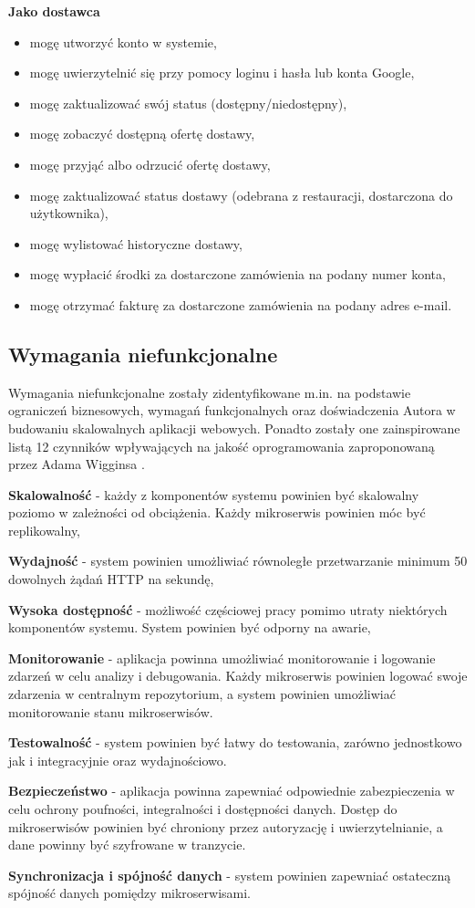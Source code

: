 \medskip

\textbf{Jako dostawca}
\begin{itemize}
    \item mogę utworzyć konto w systemie,
    \item mogę uwierzytelnić się przy pomocy loginu i hasła lub konta Google,
    \item mogę zaktualizować swój status (dostępny/niedostępny),
    \item mogę zobaczyć dostępną ofertę dostawy,
    \item mogę przyjąć albo odrzucić ofertę dostawy,
    \item mogę zaktualizować status dostawy (odebrana z restauracji, dostarczona do użytkownika),
    \item mogę wylistować historyczne dostawy,
    \item mogę wypłacić środki za dostarczone zamówienia na podany numer konta,
    \item mogę otrzymać fakturę za dostarczone zamówienia na podany adres e-mail.
\end{itemize}

\subsection{Wymagania niefunkcjonalne}

Wymagania niefunkcjonalne zostały zidentyfikowane m.in. na podstawie ograniczeń biznesowych, wymagań funkcjonalnych oraz doświadczenia Autora w budowaniu skalowalnych aplikacji webowych. Ponadto zostały one zainspirowane listą 12 czynników wpływających na jakość oprogramowania zaproponowaną przez Adama Wigginsa \cite{12factors}.

\textbf{Skalowalność} - każdy z komponentów systemu powinien być skalowalny poziomo w zależności od obciążenia. Każdy mikroserwis powinien móc być replikowalny,

\textbf{Wydajność} - system powinien umożliwiać równoległe przetwarzanie minimum 50 dowolnych żądań HTTP na sekundę,

\textbf{Wysoka dostępność} - możliwość częściowej pracy pomimo utraty niektórych komponentów systemu. System powinien być odporny na awarie,

\textbf{Monitorowanie} - aplikacja powinna umożliwiać monitorowanie i logowanie zdarzeń w celu analizy i debugowania. Każdy mikroserwis powinien logować swoje zdarzenia w centralnym repozytorium, a system powinien umożliwiać monitorowanie stanu mikroserwisów.

\textbf{Testowalność} - system powinien być łatwy do testowania, zarówno jednostkowo jak i integracyjnie oraz wydajnościowo.

\textbf{Bezpieczeństwo} - aplikacja powinna zapewniać odpowiednie zabezpieczenia w celu ochrony poufności, integralności i dostępności danych. Dostęp do mikroserwisów powinien być chroniony przez autoryzację i uwierzytelnianie, a dane powinny być szyfrowane w tranzycie.

\textbf{Synchronizacja i spójność danych} - system powinien zapewniać ostateczną spójność danych pomiędzy mikroserwisami.